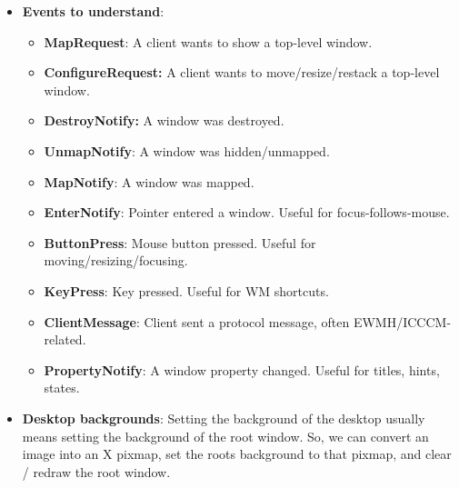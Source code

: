 \documentclass{report}
\begin{document}
\begin{itemize}
\begin{enumerate}
            \item client asks to map the window
            \item WM receives MapRequest
            \item WM starts managing the window
            \item WM positions/resizes it
            \item WM maps it
            \item user interacts with it
            \item window may be resized/moved/focused/unfocused
            \item client may unmap it
            \item client may destroy it
            \item WM removes it from internal state 
        \end{enumerate}
    \item \textbf{Events to understand}: 
        \begin{itemize}
            \item \textbf{MapRequest}:	A client wants to show a top-level window.
            \item \textbf{ConfigureRequest:}	A client wants to move/resize/restack a top-level window.
            \item \textbf{DestroyNotify:}	A window was destroyed.
            \item \textbf{UnmapNotify}:	A window was hidden/unmapped.
            \item \textbf{MapNotify}:	A window was mapped.
            \item \textbf{EnterNotify}:	Pointer entered a window. Useful for focus-follows-mouse.
            \item \textbf{ButtonPress}:	Mouse button pressed. Useful for moving/resizing/focusing.
            \item \textbf{KeyPress}:	Key pressed. Useful for WM shortcuts.
            \item \textbf{ClientMessage}:	Client sent a protocol message, often EWMH/ICCCM-related.
            \item \textbf{PropertyNotify}:	A window property changed. Useful for titles, hints, states.
        \end{itemize}
    \item \textbf{Desktop backgrounds}: Setting the background of the desktop usually means setting the background of the root window.
        \bigbreak \noindent 
        So, we can convert an image into an X pixmap, set the roots background to that pixmap, and clear / redraw the root window.
    \end{itemize}
\end{document}
